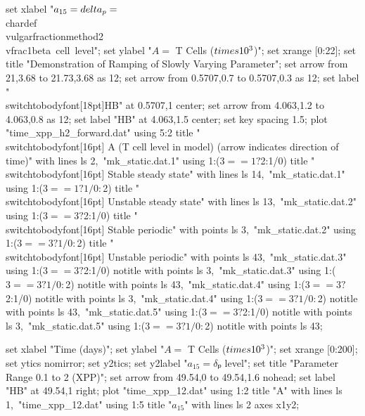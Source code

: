   set xlabel "$a_{15} = \\delta_p = $\\chardef\\vulgarfractionmethod2\\vfrac1{beta~cell~level}";
  set ylabel "$A = $ T Cells ($\\times 10^3$)";
  set xrange [0:22];
  set title "Demonstration of Ramping of Slowly Varying Parameter";
  set arrow from 21,3.68 to 21.73,3.68 as 12;
  set arrow from 0.5707,0.7 to 0.5707,0.3 as 12;
  set label "\\switchtobodyfont[18pt]HB" at 0.5707,1 center;
  set arrow from 4.063,1.2 to 4.063,0.8 as 12;
  set label "HB" at 4.063,1.5 center;
  set key spacing 1.5;
  plot "time_xpp_h2_forward.dat" using 5:2 title "\\switchtobodyfont[16pt] A (T cell level in model)  (arrow indicates direction of time)" with lines ls 2,\
       "mk_static.dat.1" using 1:($3==1?$2:1/0) title "\\switchtobodyfont[16pt] Stable steady state" with lines ls 14,\
       "mk_static.dat.1" using 1:($3==1?1/0:$2) title "\\switchtobodyfont[16pt] Unstable steady state" with lines ls 13,\
       "mk_static.dat.2" using 1:($3==3?$2:1/0) title "\\switchtobodyfont[16pt] Stable periodic" with points ls 3,\
       "mk_static.dat.2" using 1:($3==3?1/0:$2) title "\\switchtobodyfont[16pt] Unstable periodic" with points ls 43,\
       "mk_static.dat.3" using 1:($3==3?$2:1/0) notitle with points ls 3,\
       "mk_static.dat.3" using 1:($3==3?1/0:$2) notitle with points ls 43,\
       "mk_static.dat.4" using 1:($3==3?$2:1/0) notitle with points ls 3,\
       "mk_static.dat.4" using 1:($3==3?1/0:$2) notitle with points ls 43,\
       "mk_static.dat.5" using 1:($3==3?$2:1/0) notitle with points ls 3,\
       "mk_static.dat.5" using 1:($3==3?1/0:$2) notitle with points ls 43;
\stopGNUPLOTscript

\startGNUPLOTscript[time_xpp_12]
  set xlabel "Time (days)";
  set ylabel "$A = $ T Cells ($\\times 10^3$)";
  set xrange [0:200];
  set ytics nomirror;
  set y2tics;
  set y2label "$a_{15} = δₚ$ level";
  set title "Parameter Range 0.1 to 2 (XPP)";
  set arrow from 49.54,0 to 49.54,1.6 nohead;
  set label "HB" at 49.54,1 right;
  plot "time_xpp_12.dat" using 1:2 title "A" with lines ls 1,\
       "time_xpp_12.dat" using 1:5 title "$a_{15}$" with lines ls 2 axes x1y2;
\stopGNUPLOTscript

